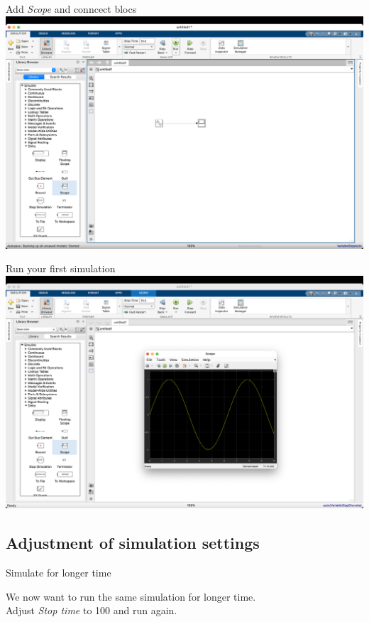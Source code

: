 \begin{frame}{ Add \textit{Scope} and conncect blocs}
    \hspace*{-11mm}
    \includegraphics[width=\paperwidth]{lesson_2/images/simulink_screen_04.png}
\end{frame}
  
\begin{frame}{Run your first simulation}
    \hspace*{-11mm}
    \includegraphics[width=\paperwidth]{lesson_2/images/simulink_screen_05.png}
\end{frame}

\subsection{Adjustment of simulation settings}
\begin{frame}{Simulate for longer time}
\Large
\begin{center}
    We now want to run the same simulation for longer time.\\
    \vfill
    \pause
    Adjust \textit{Stop time} to 100 and run again.
\end{center}
\end{frame}

